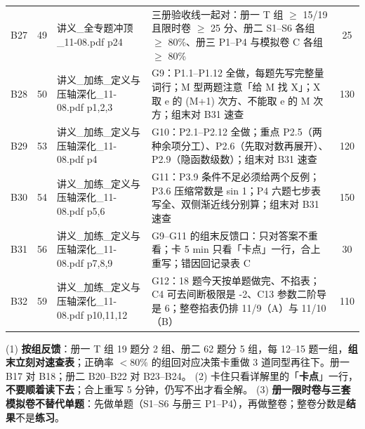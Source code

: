 \documentclass[10pt,a4paper]{ctexart}
\begin{document}
\begin{longtable}{c|c|p{4.5cm}|p{6.6cm}|c}
B27 & 49 & 讲义\_全专题冲顶\_11-08.pdf p24 & 三册验收线一起对：册一 T 组 $\geq$ 15/19 且限时卷 $\geq$ 25 分、册二 S1--S6 各组 $\geq$ 80\%、册三 P1--P4 与模拟卷 C 各组 $\geq$ 80\% & 25\\
B28 & 50 & 讲义\_加练\_定义与压轴深化\_11-08.pdf p1,2,3 & G9：P1.1--P1.12 全做，每题先写完整量词行；M 型两题注意「给 M 找 X」；X 取 e 的 (M+1) 次方、不能取 e 的 M 次方；组末对 B31 速查 & 130\\
B29 & 53 & 讲义\_加练\_定义与压轴深化\_11-08.pdf p4 & G10：P2.1--P2.12 全做；重点 P2.5（两种余项分工）、P2.6（先取对数再展开）、P2.9（隐函数级数）；组末对 B31 速查 & 120\\
B30 & 54 & 讲义\_加练\_定义与压轴深化\_11-08.pdf p5,6 & G11：P3.9 条件不足必须给两个反例；P3.6 压缩常数是 sin 1；P4 六题七步表写全、双侧渐近线分别算；组末对 B31 速查 & 150\\
B31 & 56 & 讲义\_加练\_定义与压轴深化\_11-08.pdf p7,8,9 & G9--G11 的组末反馈口：只对答案不重看；卡 5 min 只看「卡点」一行，合上重写；错因回记录表 C & 30\\
B32 & 59 & 讲义\_加练\_定义与压轴深化\_11-08.pdf p10,11,12 & G12：18 题今天按单题做完、不掐表；C4 可去间断极限是 -2、C13 参数二阶导是 6；整卷掐表仍排 11/9（A）与 11/10（B） & 110\\
\bottomrule
\end{longtable}
\normalsize
\begin{keypoint}[路线图的三条纪律]
(1) \textbf{按组反馈}：册一 T 组 19 题分 2 组、册二 62 题分 5 组，每 12--15 题一组，\textbf{组末立刻对速查表}；正确率 $<80\%$ 的组回对应决策卡重做 3 道同型再往下。册一 B17 对 B18；册二 B20--B22 对 B23--B24。
(2) 卡住只看详解里的「\textbf{卡点}」一行，\textbf{不要顺着读下去}；合上重写 5 分钟，仍写不出才看全解。
(3) \textbf{册一限时卷与三套模拟卷不替代单题}：先做单题（S1--S6 与册三 P1--P4），再做整卷；整卷分数是\textbf{结果}不是\textbf{练习}。
\end{keypoint}

\clearpage
\end{document}
